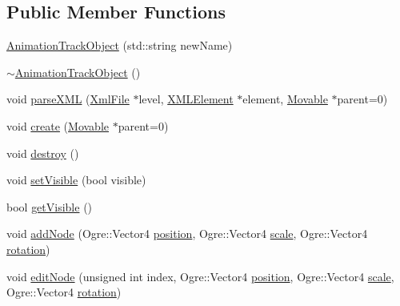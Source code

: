 \subsection*{Public Member Functions}
\begin{DoxyCompactItemize}
\item 
\hyperlink{class_rad_xml_1_1_animation_track_object_a11ad8302889cfeebd2d2cdf831b19109}{Animation\-Track\-Object} (std\-::string new\-Name)
\item 
\hyperlink{class_rad_xml_1_1_animation_track_object_ad2784d1dc4a3d807d498f3b73dfcd333}{$\sim$\-Animation\-Track\-Object} ()
\item 
void \hyperlink{class_rad_xml_1_1_animation_track_object_ae66e1e5f60ed365b6aaef87a4de2936b}{parse\-X\-M\-L} (\hyperlink{class_rad_xml_1_1_xml_file}{Xml\-File} $\ast$level, \hyperlink{class_x_m_l_element}{X\-M\-L\-Element} $\ast$element, \hyperlink{class_rad_xml_1_1_movable}{Movable} $\ast$parent=0)
\item 
void \hyperlink{class_rad_xml_1_1_animation_track_object_a53534718134637e00e4d937f4d9a2cb6}{create} (\hyperlink{class_rad_xml_1_1_movable}{Movable} $\ast$parent=0)
\item 
void \hyperlink{class_rad_xml_1_1_animation_track_object_af466359bfa580ac98e68337bab073cd8}{destroy} ()
\item 
void \hyperlink{class_rad_xml_1_1_animation_track_object_a8e9a6c3db226268874c2d73e17173717}{set\-Visible} (bool visible)
\item 
bool \hyperlink{class_rad_xml_1_1_animation_track_object_a23a30a01439521665ad5e9dd5e78af3d}{get\-Visible} ()
\item 
void \hyperlink{class_rad_xml_1_1_animation_track_object_a6feb888634eb0f1dad6031d8d794e373}{add\-Node} (Ogre\-::\-Vector4 \hyperlink{class_rad_xml_1_1_movable_a0557c828c38faf3447a6910c038e7673}{position}, Ogre\-::\-Vector4 \hyperlink{class_rad_xml_1_1_movable_a3de3093817a316ee72d98287685e88fe}{scale}, Ogre\-::\-Vector4 \hyperlink{class_rad_xml_1_1_movable_a47fdedc6734fda7e25a22e4527f56cc4}{rotation})
\item 
void \hyperlink{class_rad_xml_1_1_animation_track_object_ad689f789c4c8b0328d610101e3e55fea}{edit\-Node} (unsigned int index, Ogre\-::\-Vector4 \hyperlink{class_rad_xml_1_1_movable_a0557c828c38faf3447a6910c038e7673}{position}, Ogre\-::\-Vector4 \hyperlink{class_rad_xml_1_1_movable_a3de3093817a316ee72d98287685e88fe}{scale}, Ogre\-::\-Vector4 \hyperlink{class_rad_xml_1_1_movable_a47fdedc6734fda7e25a22e4527f56cc4}{rotation})
\item 

\end{DoxyCompactItemize}
